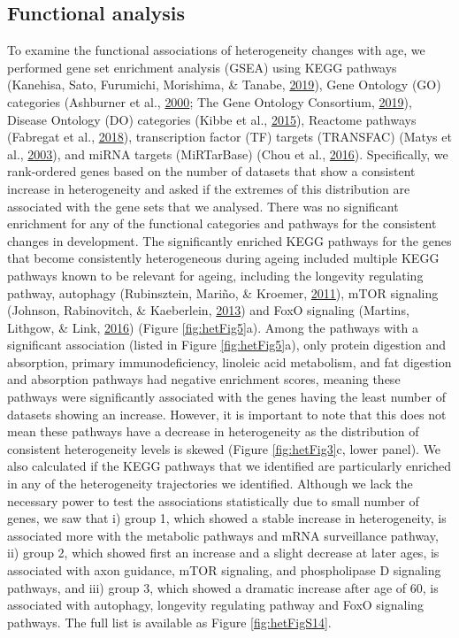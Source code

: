 \documentclass[12pt,twoside]{unicam}
\begin{document}
\hypertarget{functional-analysis}{%
\subsection{Functional analysis}\label{functional-analysis}}

To examine the functional associations of heterogeneity changes with age, we performed gene set enrichment analysis (GSEA) using KEGG pathways (Kanehisa, Sato, Furumichi, Morishima, \& Tanabe, \protect\hyperlink{ref-Kanehisa2019}{2019}), Gene Ontology (GO) categories (Ashburner et al., \protect\hyperlink{ref-Ashburner2000}{2000}; The Gene Ontology Consortium, \protect\hyperlink{ref-TheGeneOntologyConsortium2019}{2019}), Disease Ontology (DO) categories (Kibbe et al., \protect\hyperlink{ref-Kibbe2015}{2015}), Reactome pathways (Fabregat et al., \protect\hyperlink{ref-Fabregat2018}{2018}), transcription factor (TF) targets (TRANSFAC) (Matys et al., \protect\hyperlink{ref-Matys2003}{2003}), and miRNA targets (MiRTarBase) (Chou et al., \protect\hyperlink{ref-Chou2016}{2016}). Specifically, we rank-ordered genes based on the number of datasets that show a consistent increase in heterogeneity and asked if the extremes of this distribution are associated with the gene sets that we analysed. There was no significant enrichment for any of the functional categories and pathways for the consistent changes in development. The significantly enriched KEGG pathways for the genes that become consistently heterogeneous during ageing included multiple KEGG pathways known to be relevant for ageing, including the longevity regulating pathway, autophagy (Rubinsztein, Mariño, \& Kroemer, \protect\hyperlink{ref-Rubinsztein2011}{2011}), mTOR signaling (Johnson, Rabinovitch, \& Kaeberlein, \protect\hyperlink{ref-Johnson2013}{2013}) and FoxO signaling (Martins, Lithgow, \& Link, \protect\hyperlink{ref-Martins2016}{2016}) (Figure \ref{fig:hetFig5}a). Among the pathways with a significant association (listed in Figure \ref{fig:hetFig5}a), only protein digestion and absorption, primary immunodeficiency, linoleic acid metabolism, and fat digestion and absorption pathways had negative enrichment scores, meaning these pathways were significantly associated with the genes having the least number of datasets showing an increase. However, it is important to note that this does not mean these pathways have a decrease in heterogeneity as the distribution of consistent heterogeneity levels is skewed (Figure \ref{fig:hetFig3}c, lower panel). We also calculated if the KEGG pathways that we identified are particularly enriched in any of the heterogeneity trajectories we identified. Although we lack the necessary power to test the associations statistically due to small number of genes, we saw that i) group 1, which showed a stable increase in heterogeneity, is associated more with the metabolic pathways and mRNA surveillance pathway, ii) group 2, which showed first an increase and a slight decrease at later ages, is associated with axon guidance, mTOR signaling, and phospholipase D signaling pathways, and iii) group 3, which showed a dramatic increase after age of 60, is associated with autophagy, longevity regulating pathway and FoxO signaling pathways. The full list is available as Figure \ref{fig:hetFigS14}.
\end{document}
